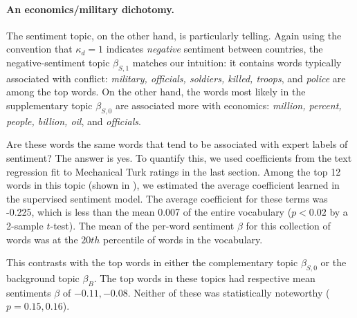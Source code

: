 \paragraph{An economics/military dichotomy.}
The sentiment topic, on the other hand, is particularly telling.
Again using the convention that $\kappa_d=1$ indicates \emph{negative}
sentiment between countries, the negative-sentiment topic
$\beta_{S,1}$ matches our intuition: it contains words typically
associated with conflict: \emph{military, officials, soldiers, killed,
  troops}, and \emph{police} are among the top words. On the other
hand, the words most likely in the supplementary topic $\beta_{S,0}$
are associated more with economics: \emph{million, percent, people,
  billion, oil}, and \emph{officials}.

Are these words the same words that tend to be associated with expert
labels of sentiment?  The answer is yes.  To quantify this, we used
coefficients from the text regression fit to Mechanical Turk ratings
in the last section.  Among the top 12 words in this topic (shown in
), we estimated the average coefficient
learned in the supervised sentiment model.  The average coefficient
for these terms was -0.225, which is less than the mean 0.007 of the
entire vocabulary ($p < 0.02$ by a 2-sample $t$-test).  The mean of
the per-word sentiment $\beta$ for this collection of words was at the
$20th$ percentile of words in the vocabulary.

This contrasts with the top words in either the complementary topic
$\beta_{S,0}$ or the background topic $\beta_{B}$.  The top words in
these topics had respective mean sentiments $\beta$ of $-0.11, -0.08$.
Neither of these was statistically noteworthy ($p=0.15,0.16$).



